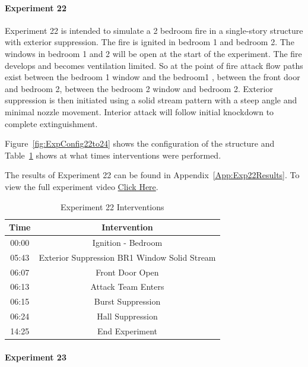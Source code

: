 \documentclass[12pt,oneside]{book}
\begin{document}
\clearpage

\paragraph{Experiment 22} \mbox{}

Experiment 22 is intended to simulate a 2 bedroom fire in a single-story structure with exterior suppression. The fire is ignited in bedroom 1 and bedroom 2. The windows in bedroom 1 and 2 will be open at the start of the experiment. The fire develops and becomes ventilation limited. So at the point of fire attack flow paths exist between the bedroom 1 window and the bedroom1 , between the front door and bedroom 2, between the bedroom 2 window and bedroom 2. Exterior suppression is then initiated using a solid stream pattern with a steep angle and minimal nozzle movement. Interior attack will follow initial knockdown to complete extinguishment. 

Figure~\ref{fig:ExpConfig22to24} shows the configuration of the structure and Table~\ref{Table:Exp22Interventions} shows at what times interventions were performed. 

The results of Experiment 22 can be found in Appendix~\ref{App:Exp22Results}. To view the full experiment video \href{https://youtu.be/gl8rc1Nsl1k}{Click Here}.

\begin{table}[H]
	\centering
	\caption{Experiment 22 Interventions}
	\begin{tabular}{|c|c|} 
		\hline
		Time & Intervention \\ \hline \hline
		00:00 & Ignition - Bedroom \\ \hline
		05:43 & Exterior Suppression BR1 Window Solid Stream \\ \hline
		06:07 & Front Door Open \\ \hline
		06:13 & Attack Team Enters\\ \hline
		06:15 & Burst Suppression \\ \hline 
		06:24 & Hall Suppression \\ \hline
		14:25 & End Experiment\\ \hline
	\end{tabular}
	\label{Table:Exp22Interventions}
\end{table}

\clearpage

\paragraph{Experiment 23} \mbox{}
\end{document}
